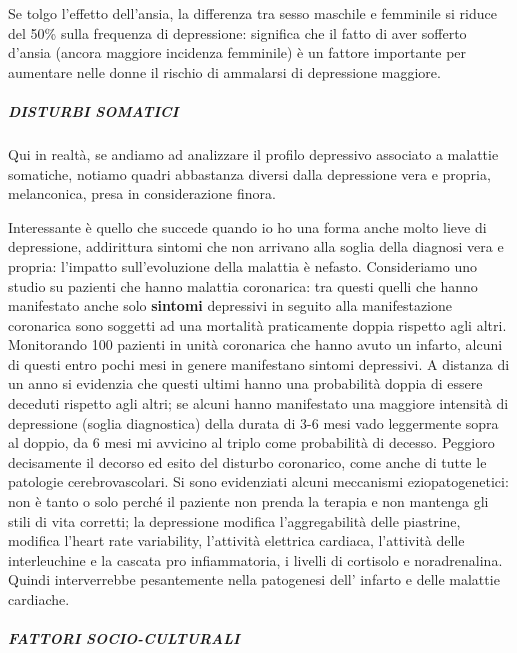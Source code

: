Se tolgo l'effetto dell'ansia, la differenza tra sesso maschile e
femminile si riduce del 50\% sulla frequenza di depressione: significa
che il fatto di aver sofferto d'ansia (ancora maggiore incidenza
femminile) è un fattore importante per aumentare nelle donne il rischio
di ammalarsi di depressione maggiore.

\subparagraph{DISTURBI SOMATICI}

Qui in realtà, se andiamo ad analizzare il profilo depressivo associato
a malattie somatiche, notiamo quadri abbastanza diversi dalla
depressione vera e propria, melanconica, presa in considerazione finora.

Interessante è quello che succede quando io ho una forma anche molto
lieve di depressione, addirittura sintomi che non arrivano alla soglia
della diagnosi vera e propria: l'impatto sull'evoluzione della malattia
è nefasto. Consideriamo uno studio su pazienti che hanno malattia
coronarica: tra questi quelli che hanno manifestato anche solo
\textbf{sintomi} depressivi in seguito alla manifestazione coronarica
sono soggetti ad una mortalità praticamente doppia rispetto agli altri.
Monitorando 100 pazienti in unità coronarica che hanno avuto un infarto,
alcuni di questi entro pochi mesi in genere manifestano sintomi
depressivi. A distanza di un anno si evidenzia che questi ultimi hanno
una probabilità doppia di essere deceduti rispetto agli altri; se alcuni
hanno manifestato una maggiore intensità di depressione (soglia
diagnostica) della durata di 3-6 mesi vado leggermente sopra al doppio,
da 6 mesi mi avvicino al triplo come probabilità di decesso. Peggioro
decisamente il decorso ed esito del disturbo coronarico, come anche di
tutte le patologie cerebrovascolari. Si sono evidenziati alcuni
meccanismi eziopatogenetici: non è tanto o solo perché il paziente non
prenda la terapia e non mantenga gli stili di vita corretti; la
depressione modifica l'aggregabilità delle piastrine, modifica l'heart
rate variability, l'attività elettrica cardiaca, l'attività delle
interleuchine e la cascata pro infiammatoria, i livelli di cortisolo e
noradrenalina. Quindi interverrebbe pesantemente nella patogenesi dell'
infarto e delle malattie cardiache.

\subparagraph{FATTORI SOCIO-CULTURALI}

